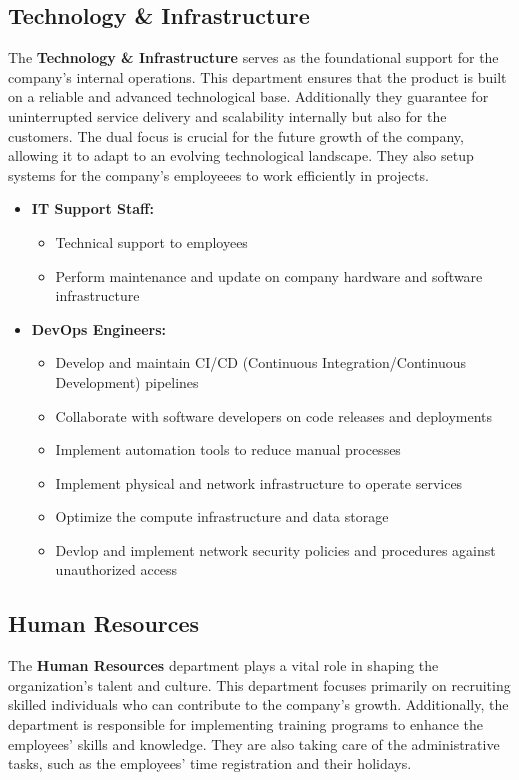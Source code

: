 \subsection{Technology \& Infrastructure}
The \textbf{Technology \& Infrastructure} serves as the foundational support for the company's internal operations.
This department ensures that the product is built on a reliable and advanced technological base.
Additionally they guarantee for uninterrupted service delivery and scalability internally but also for the customers.
The dual focus is crucial for the future growth of the company, allowing it to adapt to an evolving technological landscape.
They also setup systems for the company's employeees to work efficiently in projects.
\begin{itemize}
    \item \textbf{IT Support Staff:}
            \begin{itemize}
                \item Technical support to employees
                \item Perform maintenance and update on company hardware and software infrastructure
            \end{itemize}
    \item \textbf{DevOps Engineers:}
            \begin{itemize}
                \item Develop and maintain CI/CD (Continuous Integration/Continuous Development) pipelines
                \item Collaborate with software developers on code releases and deployments
                \item Implement automation tools to reduce manual processes
                \item Implement physical and network infrastructure to operate services
                \item Optimize the compute infrastructure and data storage
                \item Devlop and implement network security policies and procedures against unauthorized access
            \end{itemize}
\end{itemize}

\subsection{Human Resources}
The \textbf{Human Resources} department plays a vital role in shaping the organization's talent and culture.
This department focuses primarily on recruiting skilled individuals who can contribute to the company's growth.
Additionally, the department is responsible for implementing training programs to enhance the employees' skills and knowledge.
They are also taking care of the administrative tasks, such as the employees' time registration and their holidays.

